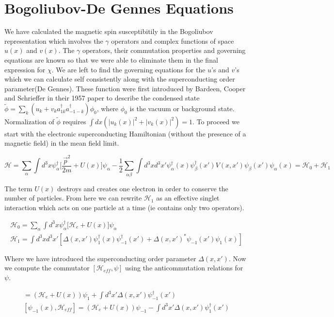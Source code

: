 \documentclass{article}
\begin{document}
\section*{Bogoliubov-De Gennes Equations}
We have calculated the magnetic spin susceptibitily in the Bogoliubov representation which involves the $\gamma$ operators and complex functions of space $u(x)$ and $v(x)$. The $\gamma$ operators, their commutation properties and governing equations are known so that we were able to eliminate them in the final expression for $\chi$. We are left to find the governing equations for the $u$'s and $v$'s which we can calculate self consistently along with the superconducting order parameter(De Gennes). These function were first introduced by Bardeen, Cooper and Schrieffer in their 1957 paper to describe the condensed state $\tilde{\phi}=\sum\limits_k (u_k+v_k a^\dagger_{1k}a^\dagger_{-1-k})\phi_0$, where $\phi_0$ is the vacuum or background state. Normalization of $\tilde{\phi}$ requires $\int dx(|u_k(x)|^2+|v_k(x)|^2)=1$. To proceed we start with the electronic superconducting Hamiltonian (without the presence of a magnetic field) in the mean field limit.

\begin{equation*}
\mathcal{H}=\sum\limits_{\alpha}\int d^3x \psi^\dagger_\alpha\bigg[\frac{\vec{p}^2}{2m}+U(x)\bigg]\psi_\alpha-\frac{1}{2}\sum\limits_{\alpha\beta}\int d^3x d^3x' \psi^\dagger_\alpha(x)\psi^\dagger_\beta(x') V(x,x')\psi_\beta(x')\psi_\alpha(x)=\mathcal{H}_0+\mathcal{H}_1
\end{equation*}

The term $U(x)$ destroys and creates one electron in order to conserve the number of particles. From here we can rewrite $\mathcal{H}_1$ as an effective singlet interaction which acts on one particle at a time (ie contains only two operators).

\begin{align*}
\mathcal{H}_0=\sum\limits_{\alpha}\int d^3x \psi^\dagger_\alpha\bigg[\mathcal{H}_e+U(x)\bigg]\psi_\alpha \\
\mathcal{H}_1=\int d^3x d^3x' [\Delta(x,x')\psi^\dagger_1(x)\psi^\dagger_{-1}(x')+\Delta(x,x')^* \psi_{-1}(x')\psi_1(x)]
\end{align*}

Where we have introduced the superconducting order parameter $\Delta(x,x')$. Now we compute the commutator $[\mathcal{H}_{eff},\psi]$ using the anticommutation relations for $\psi$.

\begin{align*}
[\psi_1(x),\mathcal{H}_{eff}]=(\mathcal{H}_e+U(x))\psi_1+\int d^3x' \Delta(x,x')\psi^\dagger_{-1}(x') \\
[\psi_{-1}(x),\mathcal{H}_{eff}]=(\mathcal{H}_e+U(x))\psi_{-1}-\int d^3x' \Delta(x,x')\psi^\dagger_{1}(x')
\end{align*}
\end{document}
